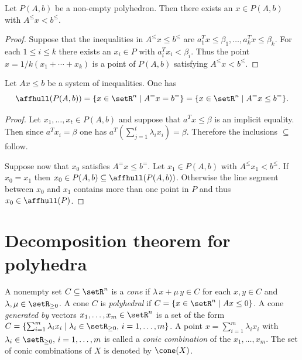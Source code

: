 \begin{lemma}
  \label{po:lem:3}
  Let $P(A,b)$ be a non-empty polyhedron.
  Then there exists an $x \in P(A,b)$ with $A^\leq x<b^\leq$. 
\end{lemma}
\begin{proof}
  Suppose that the inequalities in  $A^\leq x\leq b^\leq$ are $a_1^Tx\leq\beta_1
  ,\ldots,a_k^Tx\leq\beta_k$. For each $1\leq i\leq k$ there exists an $x_i \in P$ with
  $a_i^Tx_i<\beta_i$. Thus the point $x = 1/k (x_1+\cdots+x_k)$ is a point of
  $P(A,b)$ satisfying  $A^\leq x<b^\leq$. 
\end{proof}


\begin{lemma}
  \label{po:lem:2}
  Let $Ax\leq b$ be a system of inequalities. One has 
  \begin{displaymath}
    \affhull(P(A,b)) = \{ x \in \setR^n \mid A^=x = b^=\} = \{ x \in \setR^n \mid A^=x\leq b^=\}.
  \end{displaymath}
\end{lemma}
\begin{proof}
  Let $x_1,\ldots,x_t \in P(A,b)$ and suppose that $a^Tx\leq\beta$ is an
  implicit equality. Then since $a^Tx_i = \beta$ one has
  $a^T(\sum_{j=1}^t\lambda_ix_i) = \beta$. Therefore the inclusions $\subseteq$
  follow. 

  Suppose now that $x_0$ satisfies $A^=x\leq b^=$. Let $x_1 \in P(A,b)$
  with $A^\leq x_1<b^\leq$. If $x_0=x_1$ then $x_0 \in P(A,b) \subseteq
  \affhull(P(A,b))$.  Otherwise the line segment between $x_0$ and
  $x_1$ contains more than one point in $P$ and thus $x_0 \in
  \affhull(P)$. 
\end{proof}


\section{Decomposition theorem for polyhedra}





A nonempty set  $C\subseteq\setR^n$ is a \emph{cone} if $\lambda\, x + \mu\,y \in C$
for each $x,y\in C$ and $\lambda,\mu\in \setR_{\geq0}$. A cone  $C$ is \emph{polyhedral}
if $C = \{ x \in \setR^n \mid Ax\leq0\}$. A cone \emph{generated by} vectors
$x_1,\ldots,x_m \in \setR^n$ is a set of the form $C = \{ \sum_{i=1}^m \lambda_i x_i
\mid \lambda_i\in \setR_{\geq0}, \, i=1,\ldots,m\}$.   A point $x = \sum_{i=1}^m \lambda_i x_i$
with  $\lambda_i\in \setR_{\geq0}, \, i=1,\ldots,m$ is called a \emph{conic
  combination}   of the $x_1,\ldots,x_m$. The set of conic combinations of
$X$ is denoted by $\cone(X)$. 


